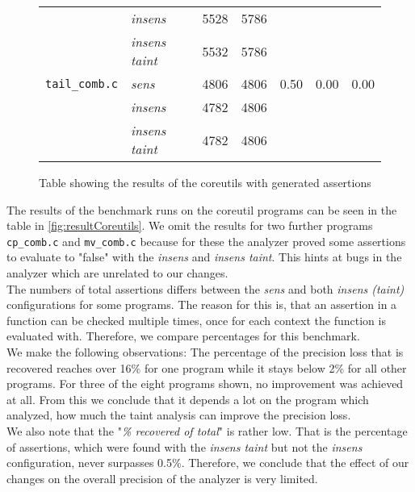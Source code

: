 \begin{figure}
\begin{tabular}{l|l||r|r||r|r|r}
          & \textit{insens} & 5528 & 5786 & & & \\
          & \textit{insens taint} & 5532 & 5786 & & & \\
          \hline         
          \texttt{tail\_comb.c} & \textit{sens} & 4806 & 4806 & 0.50 & 0.00 & 0.00\\
          & \textit{insens} & 4782 & 4806 & & & \\
          & \textit{insens taint} & 4782 & 4806 & & & \\
          \hline
        \end{tabular}
        \caption{Table showing the results of the coreutils with generated assertions}
        \label{fig:resultCoreutils}
      \end{figure}

      The results of the benchmark runs on the coreutil programs can be seen in the table in \autoref{fig:resultCoreutils}. We omit the results for two further programs \texttt{cp\_comb.c} and \texttt{mv\_comb.c} because for these the analyzer proved some assertions to evaluate to "false" with the \textit{insens} and \textit{insens taint}. This hints at bugs in the analyzer which are unrelated to our changes.\\
      The numbers of total assertions differs between the \textit{sens} and both \textit{insens (taint)} configurations for some programs. The reason for this is, that an assertion in a function can be checked multiple times, once for each context the function is evaluated with. Therefore, we compare percentages for this benchmark.\\
      We make the following observations: The percentage of the precision loss that is recovered reaches over 16\% for one program while it stays below 2\% for all other programs. For three of the eight programs shown, no improvement was achieved at all. From this we conclude that it depends a lot on the program which analyzed, how much the taint analysis can improve the precision loss.\\
      We also note that the "\textit{\% recovered of total}" is rather low. That is the percentage of assertions, which were found with the \textit{insens taint} but not the \textit{insens} configuration, never surpasses 0.5\%. Therefore, we conclude that the effect of our changes on the overall precision of the analyzer is very limited.      
    
